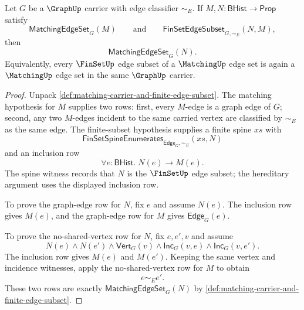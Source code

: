\begin{theorem}
\label{thm:matching-finite-subset-closure}
Let $G$ be a $\GraphUp$ carrier with edge classifier $\sim_E$. If $M,N:\mathsf{BHist}\to\mathsf{Prop}$ satisfy
$$
\mathsf{MatchingEdgeSet}_G(M)
\qquad\text{and}\qquad
\mathsf{FinSetEdgeSubset}_{G,\sim_E}(N,M),
$$
then
$$
\mathsf{MatchingEdgeSet}_G(N).
$$
Equivalently, every $\FinSetUp$ edge subset of a $\MatchingUp$ edge set is again a $\MatchingUp$ edge set in the same $\GraphUp$ carrier.
\end{theorem}
\begin{proof}
Unpack \autoref{def:matching-carrier-and-finite-edge-subset}. The matching hypothesis for $M$ supplies two rows: first, every $M$-edge is a graph edge of $G$; second, any two $M$-edges incident to the same carried vertex are classified by $\sim_E$ as the same edge. The finite-subset hypothesis supplies a finite spine $xs$ with
$$
\mathsf{FinSetSpineEnumerates}_{\mathsf{Edge}_G,\sim_E}(xs,N)
$$
and an inclusion row
$$
\forall e:\mathsf{BHist}.\;N(e)\to M(e).
$$
The spine witness records that $N$ is the $\FinSetUp$ edge subset; the hereditary argument uses the displayed inclusion row.

To prove the graph-edge row for $N$, fix $e$ and assume $N(e)$. The inclusion row gives $M(e)$, and the graph-edge row for $M$ gives $\mathsf{Edge}_G(e)$.

To prove the no-shared-vertex row for $N$, fix $e,e',v$ and assume
$$
N(e)\land N(e')\land\mathsf{Vert}_G(v)\land\mathsf{Inc}_G(v,e)\land\mathsf{Inc}_G(v,e').
$$
The inclusion row gives $M(e)$ and $M(e')$. Keeping the same vertex and incidence witnesses, apply the no-shared-vertex row for $M$ to obtain
$$
e\sim_E e'.
$$
These two rows are exactly $\mathsf{MatchingEdgeSet}_G(N)$ by \autoref{def:matching-carrier-and-finite-edge-subset}.
\end{proof}

